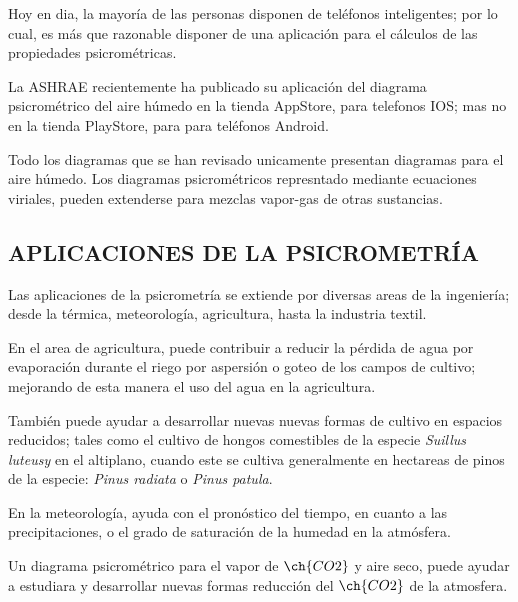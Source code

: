
Hoy en dia, la mayoría de las personas disponen de teléfonos inteligentes; por lo cual, es más que razonable disponer de una aplicación para el cálculos de las propiedades psicrométricas.

La ASHRAE recientemente ha publicado su aplicación del diagrama psicrométrico  del aire húmedo en la tienda AppStore, para telefonos IOS; mas no en la tienda PlayStore, para para teléfonos Android.

Todo los diagramas que se han revisado unicamente presentan diagramas para el aire húmedo. Los diagramas psicrométricos represntado mediante ecuaciones viriales, pueden extenderse para mezclas vapor-gas de otras sustancias.


\subsection*{APLICACIONES DE LA PSICROMETRÍA} 

Las aplicaciones de la psicrometría se extiende por diversas areas de la ingeniería; desde la térmica, meteorología, agricultura, hasta la industria textil.

En el area de agricultura, puede contribuir a reducir la pérdida de agua por evaporación durante el riego  por aspersión o goteo de los campos de cultivo; mejorando de esta manera el uso del agua en la agricultura.

También puede ayudar a desarrollar nuevas nuevas formas de cultivo en espacios reducidos; tales como el cultivo de hongos comestibles de la especie \textit{Suillus luteusy} en el altiplano, cuando este se cultiva generalmente en hectareas de pinos de la especie: \textit{Pinus radiata} o \textit{Pinus patula}.

En la meteorología, ayuda con el pronóstico del tiempo, en cuanto a las precipitaciones, o el grado de saturación de la humedad en la atmósfera.

Un diagrama psicrométrico para el vapor de $\ch{CO2}$ y aire seco, puede ayudar a estudiara y desarrollar nuevas formas reducción del $\ch{CO2}$ de la atmosfera.


